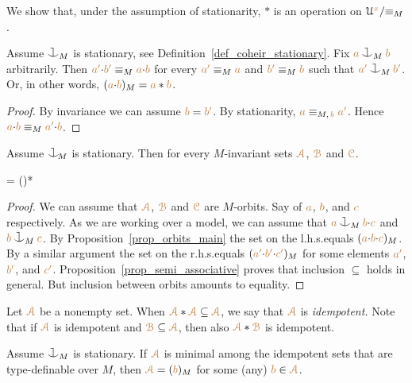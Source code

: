 We show that, under the assumption of stationarity,
$*$ is an operation on  $\EuScript U^{\color{brown} x}/{\equiv_M}$.

\begin{proposition}\label{prop_orbits_main}
Assume $\cnonfork_M$ is stationary,
see Definition~\ref{def_coheir_stationary}.
Fix ${\mr a}\cnonfork_M{\mr b}$ arbitrarily.
Then ${\color{brown} a'}{\cdot}{\color{brown} b'}\equiv_M{\color{brown} a}{\cdot}{\color{brown} b}$ for every 
${\color{brown} a'}\equiv_M{\color{brown} a}$ and  ${\color{brown} b'}\equiv_M{\color{brown} b}$ such that
${\mr a'}\cnonfork_M{\mr b'}$.
Or, in other words, $({\color{brown} a}{\cdot}{\color{brown} b})_M={\color{brown} a}*{\color{brown} b}$.
\end{proposition}
%
\begin{proof}
  By invariance we can assume ${\color{brown} b}={\color{brown} b'}$.
  By stationarity, ${\color{brown} a}\equiv_{M,\,{\color{brown} b}}{\color{brown} a'}$.
  Hence ${\color{brown} a}{\cdot}{\color{brown} b}\equiv_M{\color{brown} a'}{\cdot}{\color{brown} b}$.
\end{proof}

\begin{corollary}[ (associativity)]\label{corol_orbits_associative}
Assume $\cnonfork_{\!M}$ is stationary.
Then for every $M$-invariant sets ${\color{brown}\EuScript A}$,
${\color{brown}\EuScript B}$ and  ${\color{brown}\EuScript C}$.

\ceq{\hfill\mrA*\big(\mrB*\mrC\big)}
{=}
{\big(\mrA*\mrB\big)*\mrC}
\end{corollary}

\begin{proof}
We can assume that ${\color{brown}\EuScript A}$, ${\color{brown}\EuScript B}$ and ${\color{brown}\EuScript C}$ are $M$-orbits.
Say of ${\color{brown} a}$, ${\color{brown} b}$, and ${\color{brown} c}$ respectively.
As we are working over a model,
we can assume that ${\mr a}\cnonfork_M{\mr b}{\cdot}{\mr c}$ and ${\mr b}\cnonfork_M{\mr c}$.
By Proposition~\ref{prop_orbits_main} the set on the l.h.s.\@ equals $({\color{brown} a}{\cdot}{\color{brown} b}{\cdot}{\color{brown} c})_M$.
By a similar argument the set on the r.h.s.\@ equals $({\color{brown} a'}{\cdot}{\color{brown} b'}{\cdot}{\color{brown} c'})_M$ for some elements ${\color{brown} a'}$, ${\color{brown} b'}$, and ${\color{brown} c'}$.
Proposition~\ref{prop_semi_associative} proves that inclusion $\subseteq$ holds in general.
But inclusion between orbits amounts to equality.
\end{proof}

Let ${\color{brown}\EuScript A}$ be a nonempty set.
When ${\color{brown}\EuScript A}*{\color{brown}\EuScript A}\subseteq{\color{brown}\EuScript A}$, we say that ${\color{brown}\EuScript A}$ is \emph{idempotent.}
Note that if  ${\color{brown}\EuScript A}$ is idempotent and ${\color{brown}\EuScript B}\subseteq{\color{brown}\EuScript A}$, then also ${\color{brown}\EuScript A}*{\color{brown}\EuScript B}$ is idempotent.

\begin{lemma}\label{lem_Hindman}
Assume $\cnonfork_M$ is stationary.
If ${\color{brown}\EuScript A}$ is minimal among the
idempotent sets that are
type-definable over $M$, then ${\color{brown}\EuScript A}=({\color{brown} b})_M$ for some (any) ${\color{brown} b}\in{\color{brown}\EuScript A}$.
\end{lemma}


